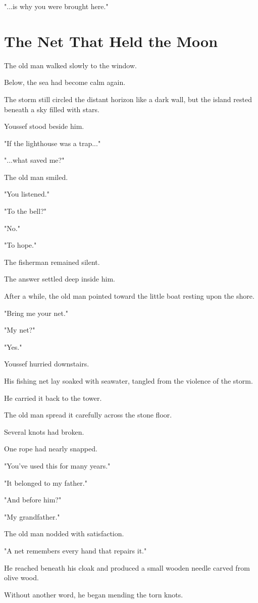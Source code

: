 \documentclass[12pt,openany]{book}
\begin{document}
"...is why you were brought here."
\section*{The Net That Held the Moon}

The old man walked slowly to the window.

Below, the sea had become calm again.

The storm still circled the distant horizon like a dark wall, but the island rested beneath a sky filled with stars.

Youssef stood beside him.

"If the lighthouse was a trap..."

"...what saved me?"

The old man smiled.

"You listened."

"To the bell?"

"No."

"To hope."

The fisherman remained silent.

The answer settled deep inside him.

After a while, the old man pointed toward the little boat resting upon the shore.

"Bring me your net."

"My net?"

"Yes."

Youssef hurried downstairs.

His fishing net lay soaked with seawater, tangled from the violence of the storm.

He carried it back to the tower.

The old man spread it carefully across the stone floor.

Several knots had broken.

One rope had nearly snapped.

"You've used this for many years."

"It belonged to my father."

"And before him?"

"My grandfather."

The old man nodded with satisfaction.

"A net remembers every hand that repairs it."

He reached beneath his cloak and produced a small wooden needle carved from olive wood.

Without another word, he began mending the torn knots.
\end{document}
